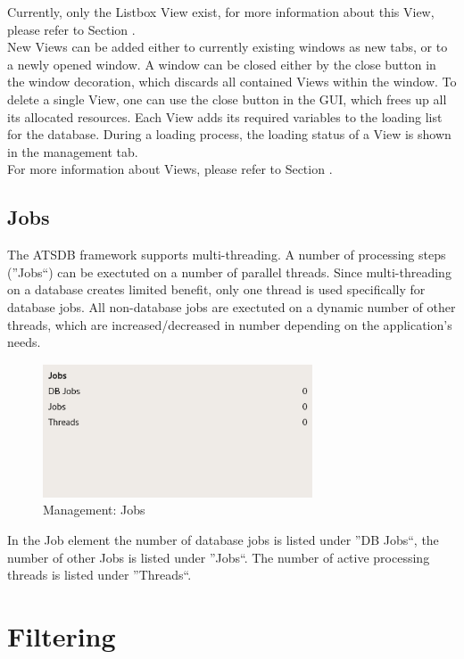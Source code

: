 \documentclass[10pt,letterpaper,extrafontsizes]{memoir}
\begin{document}
Currently, only the Listbox View exist, for more information about this View, please refer to Section .\\

New Views can be added either to currently existing windows as new tabs, or to a newly opened window. A window can be closed either by the close button in the window decoration, which discards all contained Views within the window.  To delete a single View, one can use the close button in the GUI, which frees up all its allocated resources. Each View adds its required variables to the loading list for the database.  During a loading process, the loading status  of a View is shown in the management tab.\\

For more information about Views, please refer to Section .

\subsection{Jobs}

The ATSDB framework supports multi-threading. A number of processing steps (''Jobs``) can be exectuted on a number of parallel threads. Since multi-threading on a database creates limited benefit, only one thread is used specifically for database jobs. All non-database jobs are exectuted on a dynamic number of other threads, which are increased/decreased in number depending on the application's needs. 

\begin{figure}[H]
  \center
    \includegraphics[width=8cm,frame]{../screenshots/management_jobs.png}
  \caption{Management: Jobs}
  \label{fig:management_jobs}
\end{figure}

In the Job element the number of database jobs is listed under ''DB Jobs``, the number of other Jobs is listed under ''Jobs``. The number of active processing threads is listed under ''Threads``.

\section{Filtering}
\label{sec:filtering}
\end{document}
